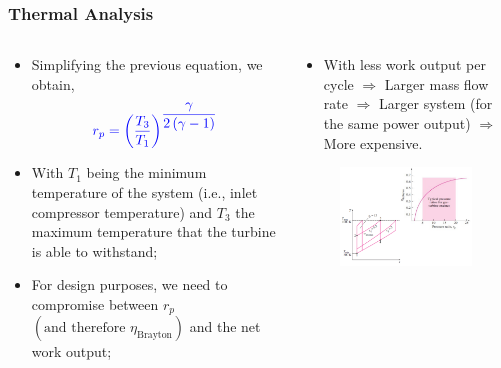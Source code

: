 \documentclass[10pt,compress]{beamer}
\newcommand{\frc}{\displaystyle\frac}
\begin{document}
\begin{frame}
 \frametitle{Thermal Analysis}
 \begin{columns}
  \begin{column}[c]{0.4\linewidth} 
 \begin{itemize}
  \item <1-> Simplifying the previous equation, we obtain, 
    \begin{displaymath}
         \textcolor{blue}{r_{p}=\left(\frc{T_{3}}{T_{1}}\right)^{\frc{\gamma}{2\left(\gamma-1\right)}}}
    \end{displaymath}
   \item <2-> With $T_{1}$ being the minimum temperature of the system (i.e., inlet compressor temperature) and $T_{3}$ the maximum temperature that the turbine is able to withstand;
   \item <3-> For design purposes, we need to compromise between $r_{p}$ $\left(\text{and therefore }\eta_{\text{Brayton}}\right)$ and the net work output;
 \end{itemize}
  \end{column}
  \begin{column}[c]{0.6\linewidth}
   \begin{itemize}
  \item <4-> With less work output per cycle $\Rightarrow$ Larger mass flow rate $\Rightarrow$ Larger system (for the same power output) $\Rightarrow$ More expensive.
   \end{itemize}
    \begin{center}
   \begin{figure}%
     \includegraphics[height=6.cm,width=6.5cm,clip]{./Pics/Brayton_cycle2}
   \end{figure}  
    \end{center}
  \end{column}  
 \end{columns}
\end{frame}
\end{document}
